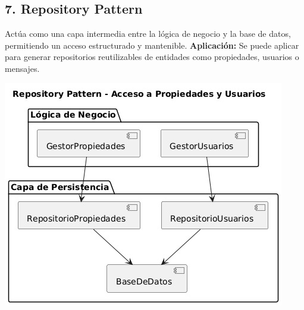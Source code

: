 	\subsection*{7. Repository Pattern}
		\noindent Actúa como una capa intermedia entre la lógica de negocio y la base de datos, permitiendo un acceso estructurado y mantenible.  
		\textbf{Aplicación:} Se puede aplicar para generar repositorios reutilizables de entidades como propiedades, usuarios o mensajes.
		\begin{center}
			\includegraphics[width=\linewidth]{figures/patterns/repository.jpg}
			\label{fig:img15}
		\end{center}
	

